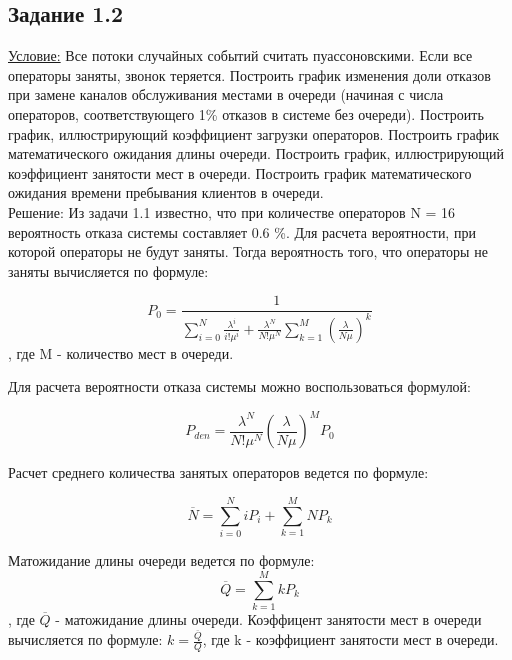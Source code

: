 \subsection*{Задание 1.2}

\underline{Условие:}  Все потоки случайных событий считать пуассоновскими. Если все операторы заняты, звонок теряется. Построить график изменения доли отказов при замене каналов обслуживания местами в очереди (начиная с числа операторов, соответствующего 1\% отказов в системе без очереди). Построить график, иллюстрирующий коэффициент загрузки операторов. Построить график математического ожидания длины очереди. Построить график, иллюстрирующий коэффициент занятости мест в очереди. Построить график математического ожидания времени пребывания клиентов в очереди. 
\\

Решение:
Из задачи 1.1 известно, что при количестве операторов  N = 16 вероятность отказа системы составляет 0.6 \%. Для расчета вероятности, при которой операторы не будут заняты.
Тогда вероятность того, что операторы не заняты вычисляется по формуле:

\begin{equation}
    P_{0} = \frac{1}{\sum_{i=0}^{N} \frac{\lambda^i}{i! \mu^i}+\frac{\lambda^N}{N! \mu^N} \sum_{k=1}^{M}{(\frac{\lambda}{N \mu})^k}}
\end{equation}
, где M - количество мест в очереди.

Для расчета вероятности отказа системы можно воспользоваться формулой:

\begin{equation}
    P_{den} = \frac{\lambda^N}{N! \mu^N} (\frac{\lambda}{N \mu})^M P_0
\end{equation}

Расчет среднего количества занятых операторов ведется по формуле:

\begin{equation}
    \overline{N} = \sum_{i=0}^{N} i P_i + \sum_{k=1}^{M} N P_k
    \label{Naver}
\end{equation}

Матожидание длины очереди ведется по формуле:
\begin{equation}
    \overline{Q} = \sum_{k=1}^{M} k P_k
    \label{}
\end{equation}, 
где $\overline{Q}$ - матожидание длины очереди. Коэффицент занятости мест в очереди вычисляется по формуле:
$k = \frac{\overline{Q}}{Q}$, где k - коэффициент занятости мест в очереди.

